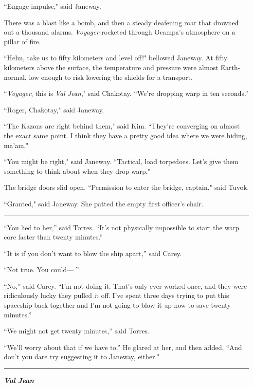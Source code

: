 \documentclass[twoside,letterpaper,12pt]{memoir}
\begin{document}
``Engage impulse," said Janeway.

There was a blast like a bomb, and then a steady deafening roar that drowned out a thousand alarms. \textit{Voyager} rocketed through Ocampa's atmosphere on a pillar of fire.

``Helm, take us to fifty kilometers and level off!" bellowed Janeway. At fifty kilometers above the surface, the temperature and pressure were almost Earth-normal, low enough to risk lowering the shields for a transport.

``\textit{Voyager}, this is \textit{Val Jean}," said Chakotay. ``We're dropping warp in ten seconds."

``Roger, Chakotay," said Janeway.

``The Kazons are right behind them," said Kim. ``They're converging on almost the exact same point. I think they have a pretty good idea where we were hiding, ma'am."

``You might be right," said Janeway. ``Tactical, load torpedoes. Let's give them something to think about when they drop warp."

The bridge doors slid open. ``Permission to enter the bridge, captain," said Tuvok.

``Granted," said Janeway. She patted the empty first officer's chair.

\begin{center}\rule{3cm}{0.4 pt}\end{center}

“You lied to her,” said Torres. “It’s not physically impossible to start the warp core faster than twenty minutes.”

“It is if you don’t want to blow the ship apart,” said Carey.

“Not true. You could--- ”

“No,” said Carey. “I’m not doing it. That’s only ever worked once, and they were ridiculously lucky they pulled it off. I’ve spent three days trying to put this spaceship back together and I’m not going to blow it up now to save twenty minutes.”

“We might not get twenty minutes,” said Torres.

“We’ll worry about that if we have to.” He glared at her, and then added, ``And don't you dare try suggesting it to Janeway, either."

\begin{center}\rule{3cm}{0.4 pt}\end{center}

\noindent\textit{\textbf{Val Jean}}\\
\end{document}
